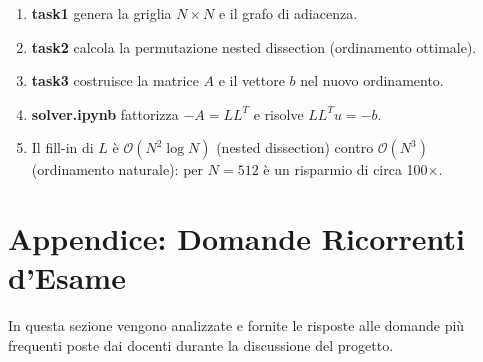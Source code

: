 \documentclass[a4paper,11pt]{article}
\theoremstyle{definition}
\begin{document}
\bigskip

\begin{tcolorbox}[concetto, title={Riepilogo del flusso end-to-end}]
\begin{enumerate}
  \item \textbf{task1} genera la griglia $N \times N$ e il grafo di adiacenza.
  \item \textbf{task2} calcola la permutazione nested dissection (ordinamento ottimale).
  \item \textbf{task3} costruisce la matrice $A$ e il vettore $b$ nel nuovo ordinamento.
  \item \textbf{solver.ipynb} fattorizza $-A = LL^T$ e risolve $LL^T u = -b$.
  \item Il fill-in di $L$ è $\mathcal{O}(N^2\log N)$ (nested dissection) contro
        $\mathcal{O}(N^3)$ (ordinamento naturale): per $N=512$ è un risparmio di circa 100$\times$.
\end{enumerate}
\end{tcolorbox}

\newpage
\section{Appendice: Domande Ricorrenti d'Esame}
\label{sec:domande_esame}

In questa sezione vengono analizzate e fornite le risposte alle domande più frequenti poste dai docenti durante la discussione del progetto.
\end{document}
